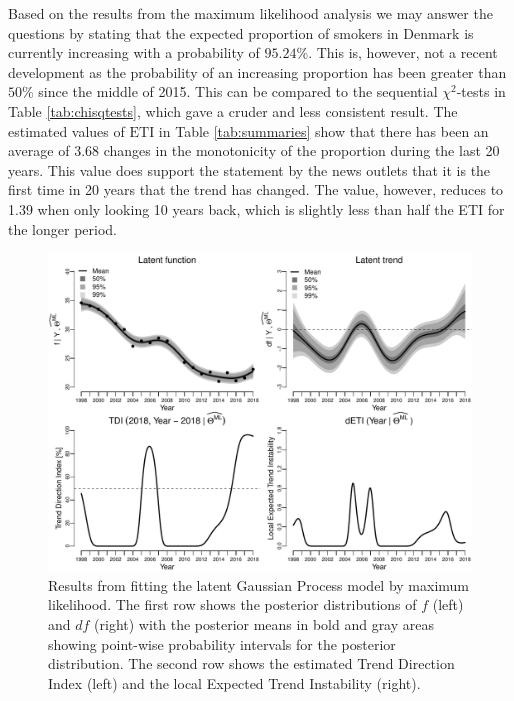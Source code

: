 \documentclass[
  11pt,
]{article}
\theoremstyle{nonumberplain}
\begin{document}
Based on the results from the maximum likelihood analysis we may answer
the questions by stating that the expected proportion of smokers in
Denmark is currently increasing with a probability of \(95.24\%\). This
is, however, not a recent development as the probability of an
increasing proportion has been greater than \(50\%\) since the middle of
2015. This can be compared to the sequential \(\chi^2\)-tests in Table
\ref{tab:chisqtests}, which gave a cruder and less consistent result.
The estimated values of \(\mathrm{ETI}\) in Table \ref{tab:summaries}
show that there has been an average of \(3.68\) changes in the
monotonicity of the proportion during the last 20 years. This value does
support the statement by the news outlets that it is the first time in
20 years that the trend has changed. The value, however, reduces to 1.39
when only looking 10 years back, which is slightly less than half the
ETI for the longer period.

\begin{figure}[htb]
\center\includegraphics{likFitPlot}
\caption{Results from fitting the latent Gaussian Process model by maximum likelihood. The first row shows the posterior distributions of $f$ (left) and $df$ (right) with the posterior means in bold and gray areas showing point-wise probability intervals for the posterior distribution. The second row shows the estimated Trend Direction Index (left) and the local Expected Trend Instability (right).}
\label{fig:likFitPlot}
\end{figure}
\end{document}
